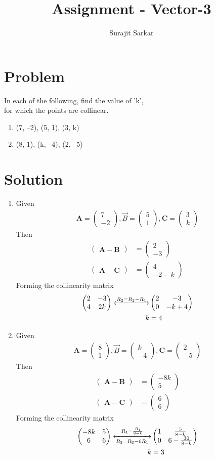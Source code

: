 \documentclass[journal,12pt,twocolumn]{IEEEtran}
\title{\mytitle}
\title{
Assignment - Vector-3
}
\author{Surajit Sarkar}
\newcommand{\myvec}[1]{\ensuremath{\begin{pmatrix}#1\end{pmatrix}}}
\let\vec\mathbf
\begin{document}
\maketitle
\tableofcontents
\bigskip
\section{\textbf{Problem}}
In each of the following, find the value of ’k’,\\ for which the points are collinear.
\begin{enumerate}[label=(\roman*)]
\item (7, –2), (5, 1), (3, k)
\item(8, 1), (k, –4), (2, –5)
\end{enumerate}
\section{\textbf{Solution}}
\begin{enumerate}[label=(\roman*)]
    \item Given
    \begin{align}
      \vec{A}=\myvec{7\\-2},\Vec{B}=\myvec{5\\1},\vec{C}=\myvec{3\\k}  
    \end{align}
    Then
    \begin{align}
        \myvec{\vec{A}-\vec{B}}&=\myvec{2\\-3}\\
        \myvec{\vec{A}-\vec{C}}&=\myvec{4\\-2-k}\
    \end{align}
    Forming the collinearity matrix
    \begin{align}
        \myvec{2&-3\\4&2k} \xleftrightarrow{R_2=R_2-R_1}&\myvec{2&-3\\0&-k+4}\\
        k&=4
        \end{align}
    
    \item Given
     \begin{align}
      \vec{A}=\myvec{8\\1},\Vec{B}=\myvec{k\\-4},\vec{C}=\myvec{2\\-5}  
    \end{align}
    Then
    \begin{align}
        \myvec{\vec{A}-\vec{B}}&=\myvec{-8k\\5}\\
        \myvec{\vec{A}-\vec{C}}&=\myvec{6\\6}\
    \end{align}
    Forming the collinearity matrix
    \begin{align}
        \myvec{-8k&5\\6&6} \xleftrightarrow[R_2=R_2-6R_1]{R_1=\frac{R_1}{8-k}}&\myvec{1&\frac{5}{8-k}\\0&6-\frac{30}{8-k}}\\
        k&=3
        \end{align}
\end{enumerate}
\end{document}
